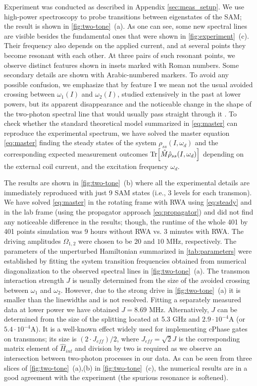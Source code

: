 \documentclass[%
 aps, prx,
 amsmath,amssymb,
 reprint,%
superscriptaddress
]{revtex4-2}
\begin{document}
Experiment was conducted as described in Appendix 
\ref{sec:meas_setup}. We use high-power 
spectroscopy to probe transitions between 
eigenstates of the SAM; the result is shown in 
\autoref{fig:two-tone}~(a). As one can see, some 
new spectral lines are visible besides the 
fundamental ones that were shown in 
\autoref{fig:experiment}~(c). Their frequency 
also depends on the applied current, and at 
several points they become resonant with each 
other. At three pairs of such resonant points, we 
observe distinct features shown in insets marked 
with Roman numbers. Some secondary details are 
shown with Arabic-numbered markers. To avoid any possible confusion, we emphasize that by feature I we mean not the usual avoided crossing between $\omega_{1}(I)$ and $\omega_{2}(I)$, studied extensively in the past at lower powers, but its apparent disappearance and the noticeable change in the shape of the two-photon spectral line that would usually pass straight through it \cite{filipp2011multimode}. To check whether the standard theoretical model summarized in 
\autoref{eq:master} can reproduce the 
experimental spectrum, we have solved the master 
equation \autoref{eq:master} finding the steady 
states of the system $\hat \rho_{ss}(I, \omega_d)$ and the 
corresponding expected measurement outcomes 
$\Tr[\hat M \hat \rho_{ss}(I, \omega_d)]$ 
depending on the external coil current, and the excitation frequency $\omega_d$.

The results are shown in 
\autoref{fig:two-tone}~(b) where all the 
experimental details are immediately reproduced 
with just 9 SAM states (i.e., 3 levels for each 
transmon). We have solved \autoref{eq:master} in 
the rotating frame with RWA using 
\autoref{eq:steady} and in the lab frame (using 
the propagator approach \autoref{eq:propagator}) 
and did not find any noticeable difference in the 
results; though, the runtime of the whole 401 by 
401 points simulation was 9 hours without RWA vs. 
3 minutes with RWA. The driving amplitudes $\Omega_{1,2}$ were chosen to be $20$ and $10$ MHz, respectively. The parameters of the unperturbed Hamiltonian summarized in \autoref{tab:parameters} were established by fitting the system transition frequencies obtained from numerical diagonalization to the observed spectral lines in \autoref{fig:two-tone}~(a). The transmon interaction strength $J$ is usually determined from the size of the avoided crossing between $\omega_1$ and $\omega_2$. However, due to the strong drive in \autoref{fig:two-tone}~(a) it is smaller than the linewidths and is not resolved. Fitting a separately measured data at lower power we have obtained $J = 8.69$ MHz. Alternatively, $J$ can be determined from the size of the  splitting located at 5.3 GHz and $2.9\cdot 10^{-4}$A (or $5.4 \cdot 10^{-4}$A). It is a well-known effect \cite{dicarlo2009demonstration} widely used for implementing cPhase gates on transmons; its size is $(2 \cdot J_{eff})/2$, where $J_{eff} = \sqrt{2} J$ is the corresponding matrix element of $\hat H_{int}$ and division by two is required as we observe an intersection between two-photon processes in our data. As can be seen from three 
slices of \autoref{fig:two-tone}~(a),(b) in 
\autoref{fig:two-tone}~(c), the numerical results 
are in a good agreement with the experiment (the 
spurious resonance is softened).
\end{document}
